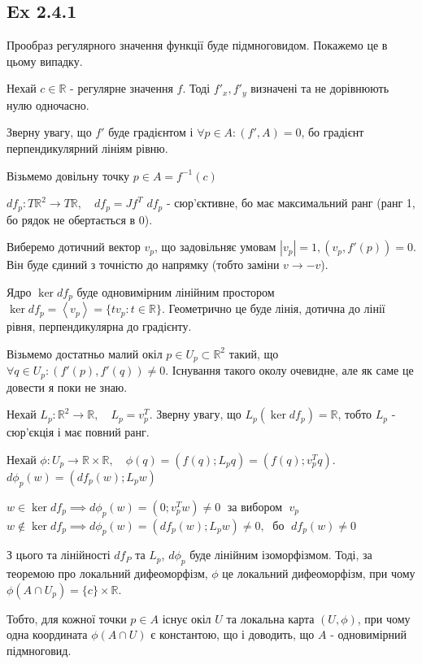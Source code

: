 \documentclass[10pt, a4paper]{article} %
\newcommand{\R}{\mathbb{R}}
\begin{document}
\subsection*{Ex 2.4.1}
Прообраз регулярного значення функції буде підмноговидом.
Покажемо це в цьому випадку.

Нехай $c\in \R$ - регулярне значення $f$.
Тоді $f'_x, f'_y$ визначені та не дорівнюють нулю одночасно.

Зверну увагу, що $f'$ буде градієнтом і $\forall p \in A: (f', A) = 0$, 
бо градієнт перпендикулярний лініям рівню.

Візьмемо довільну точку $p \in A = f^{-1}(c)$

$df_p : T\R^2 \to T\R, \quad df_p = Jf^T$
$df_p$ - сюр'єктивне, бо має максимальний ранг (ранг 1, бо рядок не обертається в 0).

Виберемо дотичний вектор $v_p$, що задовільняє умовам $|v_p|=1, (v_p,f'(p))=0$. 
Він буде єдиний з точністю до напрямку (тобто заміни $v \to -v$).

Ядро $\ker df_p$ буде одновимірним лінійним простором 
$\ker df_p = \left<v_p\right>=\{tv_p : t\in\R\}$. 
Геометрично це буде лінія, дотична до лінії рівня, перпендикулярна до градієнту.

Візьмемо достатньо малий окіл $p \in U_p \subset \R^2$ такий, що
$\forall q \in U_p: (f'(p), f'(q)) \ne 0$. 
Існування такого околу очевидне, але як саме це довести я поки не знаю.

Нехай $L_p: \R^2 \to \R, \quad L_p = v_p^T$. 
Зверну увагу, що $L_p(\ker df_p) = \R$, тобто $L_p$ - сюр'єкція і має повний ранг.

Нехай $\phi: U_p \to \R \times \R, \quad \phi(q) = (f(q); L_p q) = (f(q); v_p^Tq)$.\\
$d\phi_p(w) = (df_p(w); L_p w)$

$w \in \ker df_p \implies d\phi_p(w) = (0; v_p^T w) \ne 0\;$ за вибором $\;v_p$\\
$w \notin \ker df_p \implies d\phi_p(w) = (df_p(w); L_p w) \ne 0, \;$ бо $\;df_p(w) \ne 0$

З цього та лінійності $df_P$ та $L_p$, $d\phi_p$ буде лінійним ізоморфізмом.
Тоді, за теоремою про локальний дифеоморфізм, $\phi$ це локальний дифеоморфізм,
при чому $\phi(A \cap U_p) = \{c\} \times \R$.

Тобто, для кожної точки $p\in A$ існує окіл $U$ та локальна карта $(U, \phi)$, 
при чому одна координата $\phi(A\cap U)$ є константою, що і доводить, що $A$ - одновимірний підмноговид.
\end{document}

